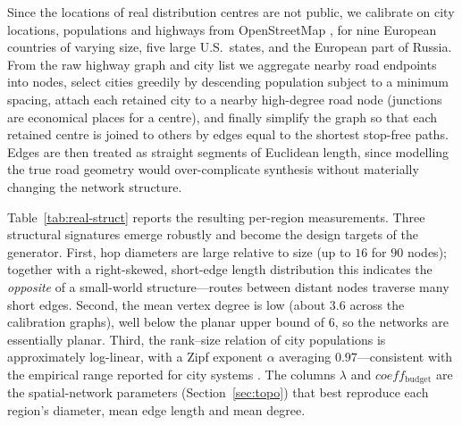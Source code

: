 \documentclass[runningheads]{llncs}
\begin{document}
Since the locations of real distribution centres are not public, we calibrate on
city locations, populations and highways from OpenStreetMap \cite{osm}, for nine
European countries of varying size, five large U.S.\ states, and the European
part of Russia. From the raw highway graph and city list we aggregate nearby
road endpoints into nodes, select cities greedily by descending population
subject to a minimum spacing, attach each retained city to a nearby high-degree
road node (junctions are economical places for a centre), and finally simplify
the graph so that each retained centre is joined to others by edges equal to the
shortest stop-free paths. Edges are then treated as straight segments of
Euclidean length, since modelling the true road geometry would over-complicate
synthesis without materially changing the network structure.

Table~\ref{tab:real-struct} reports the resulting per-region measurements. Three
structural signatures emerge robustly and become the design targets of the
generator. First, hop diameters are large relative to size (up to $16$ for $90$
nodes); together with a right-skewed, short-edge length distribution this
indicates the \emph{opposite} of a small-world structure---routes between distant
nodes traverse many short edges. Second, the mean vertex degree is low (about
$3.6$ across the calibration graphs), well below the planar upper bound of $6$,
so the networks are essentially planar. Third, the rank--size relation of city
populations is approximately log-linear, with a Zipf exponent
$\alpha$ averaging $0.97$---consistent with the empirical range reported for
city systems \cite{gabaix1999}. The columns $\lambda$ and $coeff_{\text{budget}}$
are the spatial-network parameters (Section~\ref{sec:topo}) that best reproduce
each region's diameter, mean edge length and mean degree.
\end{document}

